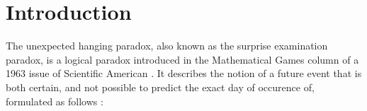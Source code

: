 \documentclass[journal]{journal}
\begin{document}
%
\IEEEpeerreviewmaketitle



\section{Introduction}
%
%
%
%
%
%

The unexpected hanging paradox, also known as the surprise examination paradox,
is a logical paradox introduced in the Mathematical Games column of a
1963 issue of Scientific American \cite{american}. It describes the notion of a future event that
is both certain, and not possible to predict the exact day of occurence of,
formulated as follows :
\end{document}
